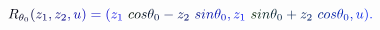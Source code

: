 \documentclass[12pt]{article}
\begin{document}
\makeatletter
\renewcommand*{\@textcolor}[3]{%
  \protect\leavevmode
  \begingroup
    \color#1{#2}#3%
  \endgroup
}
\makeatother
\begin{displaymath}
\mathcolor[RGB]{0,0,15}{R} _ { \mathcolor[RGB]{0,0,30}{\theta} _ { \mathcolor[RGB]{0,0,45}{0} } } \mathcolor[RGB]{0,0,60}{(} \mathcolor[RGB]{0,0,75}{z} _ { \mathcolor[RGB]{0,0,90}{1} } \mathcolor[RGB]{0,0,105}{,} \mathcolor[RGB]{0,0,120}{z} _ { \mathcolor[RGB]{0,0,135}{2} } \mathcolor[RGB]{0,0,150}{,} \mathcolor[RGB]{0,0,165}{u} \mathcolor[RGB]{0,0,180}{)} \mathcolor[RGB]{0,0,195}{=} \mathcolor[RGB]{0,0,210}{(} \mathcolor[RGB]{0,0,225}{z} _ { \mathcolor[RGB]{0,0,240}{1} } \mathcolor[RGB]{0,0,255}{\operatorname*} { \mathcolor[RGB]{0,15,0}{c} \mathcolor[RGB]{0,15,15}{o} \mathcolor[RGB]{0,15,30}{s} } \mathcolor[RGB]{0,15,45}{\theta} _ { \mathcolor[RGB]{0,15,60}{0} } \mathcolor[RGB]{0,15,75}{-} \mathcolor[RGB]{0,15,90}{z} _ { \mathcolor[RGB]{0,15,105}{2} } \mathcolor[RGB]{0,15,120}{\operatorname*} { \mathcolor[RGB]{0,15,135}{s} \mathcolor[RGB]{0,15,150}{i} \mathcolor[RGB]{0,15,165}{n} } \mathcolor[RGB]{0,15,180}{\theta} _ { \mathcolor[RGB]{0,15,195}{0} } \mathcolor[RGB]{0,15,210}{,} \mathcolor[RGB]{0,15,225}{z} _ { \mathcolor[RGB]{0,15,240}{1} } \mathcolor[RGB]{0,15,255}{\operatorname*} { \mathcolor[RGB]{0,30,0}{s} \mathcolor[RGB]{0,30,15}{i} \mathcolor[RGB]{0,30,30}{n} } \mathcolor[RGB]{0,30,45}{\theta} _ { \mathcolor[RGB]{0,30,60}{0} } \mathcolor[RGB]{0,30,75}{+} \mathcolor[RGB]{0,30,90}{z} _ { \mathcolor[RGB]{0,30,105}{2} } \mathcolor[RGB]{0,30,120}{\operatorname*} { \mathcolor[RGB]{0,30,135}{c} \mathcolor[RGB]{0,30,150}{o} \mathcolor[RGB]{0,30,165}{s} } \mathcolor[RGB]{0,30,180}{\theta} _ { \mathcolor[RGB]{0,30,195}{0} } \mathcolor[RGB]{0,30,210}{,} \mathcolor[RGB]{0,30,225}{u} \mathcolor[RGB]{0,30,240}{)} \mathcolor[RGB]{0,30,255}{.}
\end{displaymath}
\end{document}
